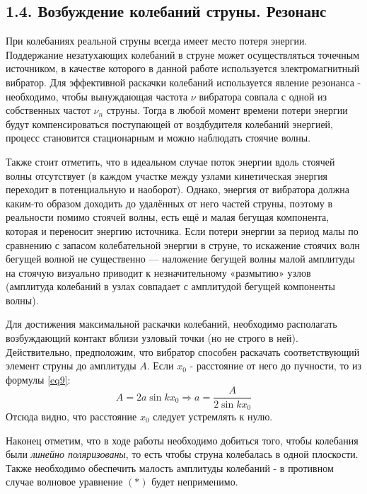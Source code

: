 \documentclass[a4paper]{article}
\begin{document}
\subsection*{1.4. Возбуждение колебаний струны. Резонанс} При колебаниях реальной струны всегда имеет место потеря энергии. Поддержание незатухающих
колебаний в струне может осуществляться точечным источником, в качестве которого в данной работе используется электромагнитный вибратор. 
Для эффективной раскачки колебаний используется явление резонанса - необходимо, чтобы вынуждающая частота $\nu$ вибратора совпала с одной из собственных частот $\nu_n$ струны. Тогда в любой момент времени потери энергии будут компенсироваться поступающей от воздбудителя колебаний энергией, процесс становится стационарным и можно наблюдать стоячие волны.

\noindent
Также стоит отметить, что в идеальном случае поток энергии вдоль стоячей волны отсутствует (в каждом участке между узлами кинетическая энергия переходит в потенциальную и наоборот). Однако, энергия от вибратора должна каким-то образом доходить до удалённых от него частей струны, поэтому в реальности помимо стоячей волны, есть ещё и малая бегущая компонента, которая и переносит энергию источника. Если потери энергии за период малы по сравнению с запасом колебательной энергии в струне, то искажение стоячих волн бегущей волной не существенно — наложение бегущей волны малой амплитуды на стоячую визуально приводит к незначительному «размытию» узлов (амплитуда колебаний в узлах совпадает с амплитудой бегущей компоненты волны).

\noindent
Для достижения максимальной раскачки колебаний, необходимо располагать возбуждающий контакт вблизи узловый точки (но не строго в ней). Действительно, предположим, что вибратор способен раскачать соответствующий элемент струны до амплитуды $A$. Если $x_0$ - расстояние от него до пучности, то из формулы \eqref{eq9}:
\[A = 2a \sin{kx_0} \Rightarrow a = \frac{A}{2\sin{kx_0}} \]
Отсюда видно, что расстояние $x_0$ следует устремлять к нулю.

\noindent
Наконец отметим, что в ходе работы необходимо добиться того, чтобы колебания были \textit{линейно поляризованы}, то есть чтобы струна колебалась в одной плоскости. Также необходимо обеспечить малость амплитуды колебаний - в противном случае волновое уравнение $(*)$ будет неприменимо.
\end{document}
